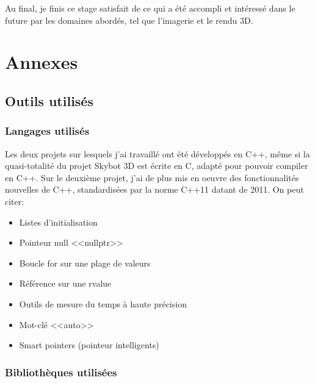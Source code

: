 \documentclass[a4paper,french,12pt]{article}
\begin{document}
	Au final, je finis ce stage satisfait de ce qui a été accompli et intéressé dans le future par les domaines abordés, 
	tel que l'imagerie et le rendu 3D.
	\newpage
\section{Annexes}
	
	\subsection{Outils utilisés}

		\subsubsection{Langages utilisés}
		    Les deux projets sur lesquels j'ai travaillé ont été développés en C++, même si la quasi-totalité 
		    du projet Skybot 3D est écrite en C, adapté pour pouvoir compiler en C++.
		    Sur le deuxième projet, j'ai de plus mis en oeuvre des fonctionnalités nouvelles de C++, standardisées
		    par la norme C++11 datant de 2011. On peut citer:\\
		    
		    \begin{itemize}
		    \item Listes d'initialisation 
		    \item Pointeur null <<nullptr>>
		    \item Boucle for sur une plage de valeurs
		    \item Référence sur une rvalue
		    \item Outils de mesure du temps à haute précision
		    \item Mot-clé <<auto>>
		    \item Smart pointers (pointeur intelligents)
		    \end{itemize}
	
		\subsubsection{Bibliothèques utilisées}
\end{document}
